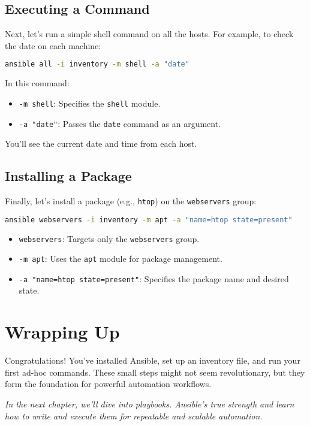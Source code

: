 \subsection{Executing a Command}

Next, let's run a simple shell command on all the hosts. For example, to check the date on each machine:
\begin{lstlisting}[language=bash, caption=Run Shell Command with Ansible]
ansible all -i inventory -m shell -a "date"
\end{lstlisting}

In this command:
\begin{itemize}
    \item \texttt{-m shell}: Specifies the \texttt{shell} module.
    \item \texttt{-a "date"}: Passes the \texttt{date} command as an argument.
\end{itemize}

You'll see the current date and time from each host.

\subsection{Installing a Package}

Finally, let's install a package (e.g., \texttt{htop}) on the \texttt{webservers} group:
\begin{lstlisting}[language=bash, caption=Install a Package]
ansible webservers -i inventory -m apt -a "name=htop state=present"
\end{lstlisting}

\begin{itemize}
    \item \texttt{webservers}: Targets only the \texttt{webservers} group.
    \item \texttt{-m apt}: Uses the \texttt{apt} module for package management.
    \item \texttt{-a "name=htop state=present"}: Specifies the package name and desired state.
\end{itemize}

\section{Wrapping Up}

Congratulations! You've installed Ansible, set up an inventory file, and run your first ad-hoc commands. These small steps might not seem revolutionary, but they form the foundation for powerful automation workflows.

\vspace{1em}

\textit{In the next chapter, we'll dive into playbooks. Ansible's true strength and learn how to write and execute them for repeatable and scalable automation.}
